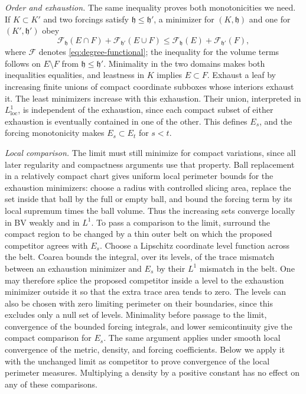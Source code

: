\emph{Order and exhaustion.}
The same inequality proves both monotonicities we need.  If $K\subset K'$
and two forcings satisfy $\mathfrak h\le\mathfrak h'$, a minimizer for
$(K,\mathfrak h)$ and one for $(K',\mathfrak h')$ obey
\[
 \mathcal F_{\mathfrak h}(E\cap F)+\mathcal F_{\mathfrak h'}(E\cup F)
              \le \mathcal F_{\mathfrak h}(E)+\mathcal F_{\mathfrak h'}(F),
\]
where $\mathcal F$ denotes \eqref{eq:degree-functional}; the inequality for
the volume terms follows on $E\setminus F$ from
$\mathfrak h\le\mathfrak h'$.  Minimality in
the two domains makes both inequalities equalities, and leastness in $K$
implies $E\subset F$.  Exhaust a leaf by increasing finite unions of
compact coordinate subboxes whose interiors exhaust it.  The least
minimizers increase with this exhaustion.  Their union, interpreted in
$L^1_{\mathrm{loc}}$, is independent of the exhaustion, since each compact
subset of either exhaustion is eventually contained in one of the other.
This defines $E_s$, and the forcing monotonicity makes $E_s\subset E_t$
for $s<t$.

\emph{Local comparison.}
The limit must still minimize for compact variations, since all later
regularity and compactness arguments use that property.
Ball replacement in a relatively compact chart gives uniform local
perimeter bounds for the exhaustion minimizers: choose a radius with
controlled slicing area, replace the set inside that ball by the full or
empty ball, and bound the forcing term by its local supremum times the
ball volume.  Thus the increasing sets converge locally in BV weakly and
in $L^1$.  To pass a comparison to the limit, surround the compact region
to be changed by a thin outer belt on which the proposed competitor
agrees with $E_s$.  Choose a Lipschitz coordinate level function across
the belt.  Coarea bounds the integral, over its levels, of the trace
mismatch between an exhaustion minimizer and $E_s$ by their $L^1$
mismatch in the belt.  One may therefore splice the proposed competitor
inside a level to the exhaustion minimizer outside it so that the extra
trace area tends to zero.  The levels can also be chosen with zero
limiting perimeter on their boundaries, since this excludes only a null
set of levels.  Minimality before passage to the limit, convergence of
the bounded forcing integrals, and lower semicontinuity give the compact
comparison for $E_s$.  The same argument applies under smooth local
convergence of the metric, density, and forcing coefficients.  Below we
apply it with the unchanged limit as competitor to prove convergence of
the local perimeter measures.  Multiplying a density by a positive
constant has no effect on any of these comparisons.

